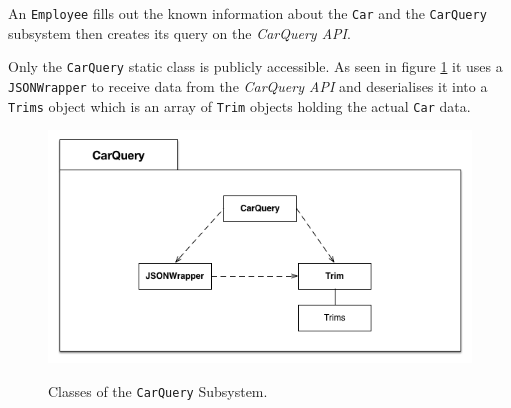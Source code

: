 An \texttt{Employee} fills out the known information about the \texttt{Car} and the \texttt{CarQuery} subsystem then creates its query on the \textit{CarQuery API}.

Only the \texttt{CarQuery} static class is publicly accessible. As seen in figure \ref{fig:carquerysubsystem} it uses a \texttt{JSONWrapper} to receive data from the \textit{CarQuery API} and deserialises it into a \texttt{Trims} object which is an array of \texttt{Trim} objects holding the actual \texttt{Car} data.
\begin{figure}[H]
	\centering
	\includegraphics[width=\textwidth]{Figures/CarQuerySubsystemDecomposition}\\
	\caption{Classes of the \texttt{CarQuery} Subsystem.}
	\label{fig:carquerysubsystem}
\end{figure}